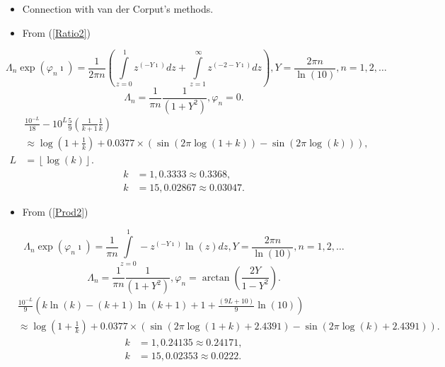 \documentclass[titlepage,fleqn]{article}%
\begin{document}
\begin{itemize}
\item Connection with van der Corput's methods.

\item From (\ref{Ratio2})
\end{itemize}

%

\[
\Lambda_{n}\exp(\varphi_{n}\imath)=\frac{1}{2\pi n}\left(
{\displaystyle\int\limits_{z=0}^{\ 1}}
z^{(-Y\imath)}dz+%
{\displaystyle\int\limits_{z=1}^{\ \infty}}
z^{(-2-Y\imath)}dz\right)  ,Y=\frac{2\pi n}{\ln(10)},n=1,2,\ldots
\]%
\[
\Lambda_{n}=\frac{1}{\pi n}\frac{1}{(1+Y^{2})},\varphi_{n}=0.
\]%
\begin{align}
&  \frac{10^{-L}}{18}-10^{L}\frac{5}{9}\left(  \frac{1}{k+1}\frac{1}%
{k}\right)  \label{Ratio3}\\
&  \approx\log\left(  1+\frac{1}{k}\right)  +0.0377\times\left(  \sin\left(
2\pi\log(1+k)\right)  -\sin\left(  2\pi\log(k)\right)  \right)  ,\nonumber\\
L &  =\left\lfloor \log(k)\right\rfloor .\nonumber
\end{align}%
\begin{align*}
k &  =1,0.3333\approx0.3368,\\
k &  =15,0.02867\approx0.03047.
\end{align*}


\begin{itemize}
\item From (\ref{Prod2})
\end{itemize}

%

\[
\Lambda_{n}\exp(\varphi_{n}\imath)=\frac{1}{\pi n}%
{\displaystyle\int\limits_{z=0}^{1}}
-z^{(-Y\imath)}\ln(z)dz,Y=\frac{2\pi n}{\ln(10)},n=1,2,\ldots
\]%
\[
\Lambda_{n}=\frac{1}{\pi n}\frac{1}{(1+Y^{2})},\varphi_{n}=\arctan\left(
\frac{2Y}{1-Y^{2}}\right)  .
\]%
\begin{align}
&  \frac{10^{-L}}{9}\left(  k\ln(k)-(k+1)\ln(k+1)+1+\frac{(9L+10)}{9}%
\ln(10)\right)  \label{Prod3}\\
&  \approx\log\left(  1+\frac{1}{k}\right)  +0.0377\times\left(  \sin\left(
2\pi\log(1+k)+2.4391\right)  -\sin\left(  2\pi\log(k)+2.4391\right)  \right)
.\nonumber
\end{align}%
\begin{align*}
k &  =1,0.24135\approx0.24171,\\
k &  =15,0.02353\approx0.0222.
\end{align*}
\end{document}
